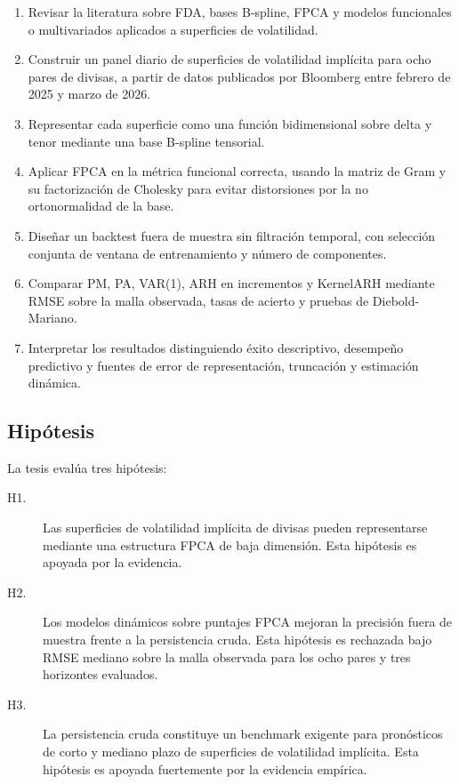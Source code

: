 \documentclass[12pt,a4paper]{article}
\newcommand{\SVIs}{superficies de volatilidad implícita}
\begin{document}
\begin{enumerate}
  \item Revisar la literatura sobre FDA, bases B-spline, FPCA y modelos funcionales o multivariados aplicados a superficies de volatilidad.
  \item Construir un panel diario de \SVIs{} para ocho pares de divisas, a partir de datos publicados por Bloomberg entre febrero de 2025 y marzo de 2026.
  \item Representar cada superficie como una función bidimensional sobre delta y tenor mediante una base B-spline tensorial.
  \item Aplicar FPCA en la métrica funcional correcta, usando la matriz de Gram y su factorización de Cholesky para evitar distorsiones por la no ortonormalidad de la base.
  \item Diseñar un backtest fuera de muestra sin filtración temporal, con selección conjunta de ventana de entrenamiento y número de componentes.
  \item Comparar PM, PA, VAR(1), ARH en incrementos y KernelARH mediante RMSE sobre la malla observada, tasas de acierto y pruebas de Diebold-Mariano.
  \item Interpretar los resultados distinguiendo éxito descriptivo, desempeño predictivo y fuentes de error de representación, truncación y estimación dinámica.
\end{enumerate}

\subsection{Hipótesis}

La tesis evalúa tres hipótesis:

\begin{description}
  \item[H1.] Las \SVIs{} de divisas pueden representarse mediante una estructura FPCA de baja dimensión. Esta hipótesis es apoyada por la evidencia.
  \item[H2.] Los modelos dinámicos sobre puntajes FPCA mejoran la precisión fuera de muestra frente a la persistencia cruda. Esta hipótesis es rechazada bajo RMSE mediano sobre la malla observada para los ocho pares y tres horizontes evaluados.
  \item[H3.] La persistencia cruda constituye un benchmark exigente para pronósticos de corto y mediano plazo de \SVIs{}. Esta hipótesis es apoyada fuertemente por la evidencia empírica.
\end{description}
\end{document}
